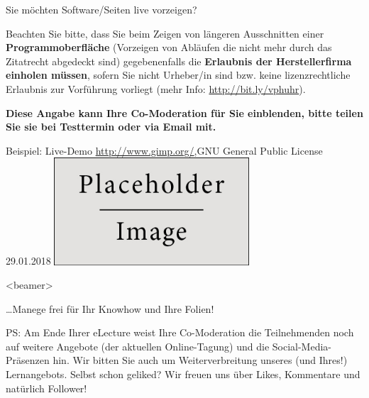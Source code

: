 \documentclass[main.tex]{subfiles}
\begin{document}
\begin{frame}{Sie möchten Software/Seiten live vorzeigen?}
	\scriptsize
	\setlength{\parskip}{0.75\baselineskip}

	Beachten Sie bitte, dass Sie beim Zeigen von längeren Ausschnitten einer \textbf{Programmoberfläche} (Vorzeigen von Abläufen die nicht mehr durch das Zitatrecht abgedeckt sind) gegebenenfalls die \textbf{Erlaubnis der Herstellerfirma einholen müssen}, sofern Sie nicht Urheber/in sind bzw. keine lizenzrechtliche Erlaubnis zur Vorführung vorliegt (mehr Info: \url{http://bit.ly/vphuhr}).

	\textbf{Diese Angabe kann Ihre Co-Moderation für Sie einblenden, bitte teilen Sie sie bei Testtermin oder via Email mit.}

	\begin{block}{\scriptsize Beispiel: Live-Demo \href{GIMP}{http://www.gimp.org/},GNU General Public License 29.01.2018}
		\centering
		\includegraphics[height=4cm]{figures/placeholder}
	\end{block}
\end{frame}


\miniframesoff
\begin{frame}<beamer>{}
	\begin{center}
		\ldots Manege frei für Ihr Knowhow und Ihre Folien!
	\end{center}
	\vspace{3cm}
	\tiny
	PS: Am Ende Ihrer eLecture weist Ihre Co-Moderation die Teilnehmenden noch auf weitere Angebote (\zB der aktuellen Online-Tagung) und die Social-Media-Präsenzen hin. Wir bitten Sie auch um Weiterverbreitung unseres (und Ihres!) Lernangebots. Selbst schon geliked? Wir freuen uns über Likes, Kommentare und natürlich Follower!
\end{frame}
\end{document}

